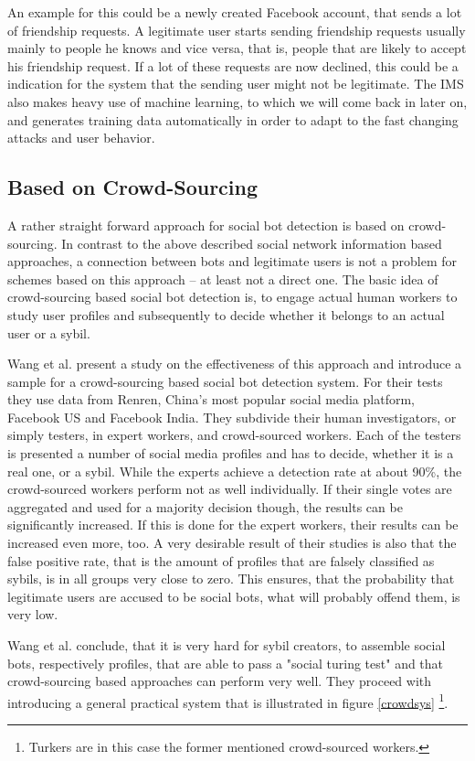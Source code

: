 An example for this could be a newly created Facebook account, that sends a lot of friendship requests. A legitimate user starts sending friendship requests usually mainly to people he knows and vice versa, that is, people that are likely to accept his friendship request. If a lot of these requests are now declined, this could be a indication for the system that the sending user might not be legitimate.  The IMS also makes heavy use of machine learning, to which we will come back in later on, and generates training data automatically in order to adapt to the fast changing attacks and user behavior.

\subsection{Based on Crowd-Sourcing}
A rather straight forward approach for social bot detection is based on crowd-sourcing. In contrast to the above described social network information based approaches, a connection between bots and legitimate users is not a problem for schemes based on this approach -- at least not a direct one. The basic idea of crowd-sourcing based social bot detection is, to engage actual human workers to study user profiles and subsequently to decide whether it belongs to an actual user or a sybil.

Wang et al. \cite{wangcrowd} present a study on the effectiveness of this approach and introduce a sample for a crowd-sourcing based social bot detection system.  For their tests they use data from Renren, China's most popular social media platform, Facebook US and Facebook India. They subdivide their human investigators, or simply testers, in expert workers, and crowd-sourced workers.  Each of the testers is presented a number of social media profiles and has to decide, whether it is a real one, or a sybil. While the experts achieve a detection rate at about 90\%, the crowd-sourced workers perform not as well individually. If their single votes are aggregated and used for a majority decision though, the results can be significantly increased. If this is done for the expert workers, their results can be increased even more, too. A very desirable result of their studies is also that the false positive rate, that is the amount of profiles that are falsely classified as sybils, is in all groups very close to zero. This ensures, that the probability that legitimate users are accused to be social bots, what will probably offend them, is very low.

Wang et al. conclude, that it is very hard for sybil creators, to assemble social bots, respectively profiles, that are able to pass a "social turing test" and that crowd-sourcing based approaches can perform very well. They proceed with introducing a general practical system that is illustrated in figure \ref{crowdsys} \footnote{Turkers are in this case the former mentioned crowd-sourced workers.}.

